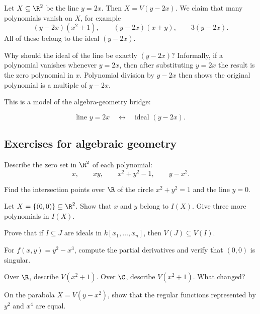 Let $X\subseteq\R^2$ be the line $y=2x$. Then $X=V(y-2x)$. We claim that many
polynomials vanish on $X$, for example
\[
(y-2x)(x^2+1),\qquad (y-2x)(x+y),\qquad 3(y-2x).
\]
All of these belong to the ideal $(y-2x)$.

Why should the ideal of the line be exactly $(y-2x)$? Informally, if a
polynomial vanishes whenever $y=2x$, then after substituting $y=2x$ the result
is the zero polynomial in $x$. Polynomial division by $y-2x$ then shows the
original polynomial is a multiple of $y-2x$.

This is a model of the algebra-geometry bridge:

\[
\text{line } y=2x
\quad\leftrightarrow\quad
\text{ideal } (y-2x).
\]

\subsection{Exercises for algebraic geometry}

\begin{exercise}
Describe the zero set in $\R^2$ of each polynomial:
\[
x,\qquad xy,\qquad x^2+y^2-1,\qquad y-x^2.
\]
\end{exercise}

\begin{exercise}
Find the intersection points over $\R$ of the circle $x^2+y^2=1$ and the line
$y=0$.
\end{exercise}

\begin{exercise}
Let $X=\{(0,0)\}\subseteq\R^2$. Show that $x$ and $y$ belong to $I(X)$. Give
three more polynomials in $I(X)$.
\end{exercise}

\begin{exercise}
Prove that if $I\subseteq J$ are ideals in $k[x_1,\ldots,x_n]$, then
$V(J)\subseteq V(I)$.
\end{exercise}

\begin{exercise}
For $f(x,y)=y^2-x^3$, compute the partial derivatives and verify that
$(0,0)$ is singular.
\end{exercise}

\begin{exercise}
Over $\R$, describe $V(x^2+1)$. Over $\C$, describe $V(x^2+1)$. What changed?
\end{exercise}

\begin{exercise}
On the parabola $X=V(y-x^2)$, show that the regular functions represented by
$y^2$ and $x^4$ are equal.
\end{exercise}

